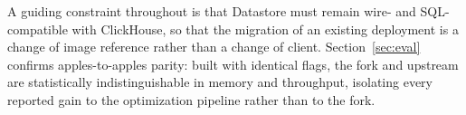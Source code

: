 A guiding constraint throughout is that Datastore must remain wire- and
SQL-compatible with ClickHouse, so that the migration of an existing
deployment is a change of image reference rather than a change of client.
Section~\ref{sec:eval} confirms apples-to-apples parity: built with identical
flags, the fork and upstream are statistically indistinguishable in memory and
throughput, isolating every reported gain to the optimization pipeline rather
than to the fork.
